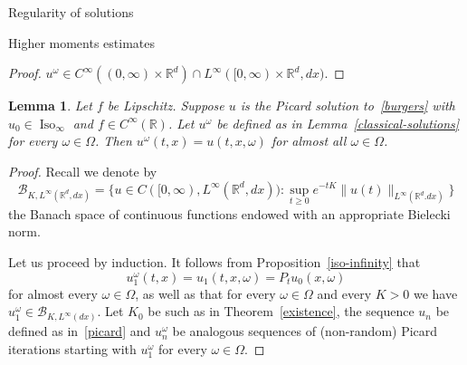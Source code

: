 \documentclass[a4paper,10pt,fleqn]{amsart}
\newtheorem{lemma}[theorem]{Lemma}
\theoremstyle{remark}
\theoremstyle{definition}
\DeclareMathOperator{\Iso}{Iso}
\newcommand{\X} {{\mathbb{R}^d}}
\newcommand{\R} {\mathbb{R}}
\newcommand{\T} {[0,\infty)}
\renewcommand{\=} {\overset{d}{=}}
\begin{document}
\begin{section}{Regularity of solutions}
\begin{subsection}{Higher moments estimates}
\begin{proof}
     $u^\omega\in C^\infty((0,\infty)\times\X)\cap L^\infty(\T\times\X,dx)$.
    \end{proof}
    \begin{lemma}\label{classical-solutions-equiv}
     Let $f$ be Lipschitz. Suppose $u$ is the Picard solution to~\eqref{burgers} with $u_0\in\Iso_\infty$ and $f\in C^\infty(\R)$.
     Let $u^\omega$ be defined as in Lemma~\ref{classical-solutions} for every $\omega\in\Omega$.
     Then $u^\omega(t,x) = u(t,x,\omega)$ for almost all $\omega\in\Omega$.
    \end{lemma}
    \begin{proof}
    Recall we denote by 
    \begin{equation*}
    \mathcal{B}_{K,L^\infty(\X,dx)} = \{u\in C([0,\infty),L^\infty(\X,dx)):\sup_{t\geq0} e^{-tK}\|u(t)\|_{L^\infty(\X.dx)}\}
    \end{equation*}
    the Banach space of continuous functions endowed with an appropriate Bielecki norm.
    
    Let us proceed by induction. It follows from Proposition~\ref{iso-infinity} that
    \begin{equation*}
     u_1^\omega(t,x) = u_1(t,x,\omega) = P_t u_0(x,\omega)    
    \end{equation*}
    for almost every $\omega\in\Omega$, as well as that for every $\omega\in\Omega$
    and every $K>0$ we have $u_1^\omega\in \mathcal{B}_{K,L^\infty(dx)}$.
    Let $K_0$ be such as in Theorem~\ref{existence}, the sequence $u_n$ be defined as in~\eqref{picard} and $u_n^\omega$ be analogous sequences of (non-random) Picard iterations starting with $u_1^\omega$ for every $\omega\in\Omega$. 
    

\end{proof}
\end{subsection}
\end{section}
\end{document}
